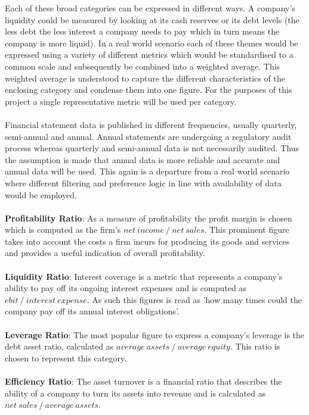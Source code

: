 \documentclass[dvips,12pt]{article}
\begin{document}
Each of these broad categories can be expressed in different ways. A company's liquidity could be measured by looking at its cash reserves or its debt levels (the less debt the less interest a company needs to pay which in turn means the company is more liquid). In a real world scenario each of these themes would be expressed using a variety of different metrics which would be standardised to a common scale and subsequently be combined into a weighted average. This weighted average is understood to capture the different characteristics of the enclosing category and condense them into one figure. For the purposes of this project a single representative metric will be used per category.
\\\\
Financial statement data is published in different frequencies, usually quarterly, semi-annual and annual. Annual statements are undergoing a regulatory audit process whereas quarterly and semi-annual data is not necessarily audited. Thus the assumption is made that annual data is more reliable and accurate and annual data will be used. This again is a departure from a real world scenario where different filtering and preference logic in line with availability of data would be employed.
\\\\
\textbf{Profitability Ratio}:
As a measure of profitability the profit margin is chosen which is computed as the firm's $net~income~/~net~sales$. This prominent figure takes into account the costs a firm incurs for producing its goods and services and provides a useful indication of overall profitability.
\\\\
\textbf{Liquidity Ratio}:
Interest coverage is a metric that represents a company's ability to pay off its ongoing interest expenses and is computed as $ebit~/~interest~expense$. As such this figures is read as 'how many times could the company pay off its annual interest obligations'.
\\\\
\textbf{Leverage Ratio}:
The most popular figure to express a company's leverage is the debt asset ratio, calculated as $average~assets~/~average~equity$. This ratio is chosen to represent this category.
\\\\
\textbf{Efficiency Ratio}:
The asset turnover is a financial ratio that describes the ability of a company to turn its assets into revenue and is calculated as $net~sales~/~average~assets$.
\end{document}
